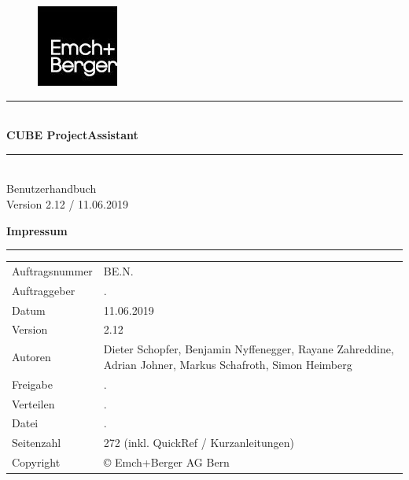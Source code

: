 \documentclass[12pt]{article} %
\newcommand{\HRule}{\rule{\linewidth}{0.5mm}} %
\begin{document}

\begin{titlepage}


\begin{figure}[t] %
\flushright  %
\includegraphics[width=0.2\linewidth]{0_EmBeLogo}
\end{figure}

\vspace*{6cm}

\center %

\HRule \\[0.4cm]
{ \huge \bfseries CUBE ProjectAssistant}\\[0.4cm] %
\HRule \\[1.5cm]

\textsf{\Large Benutzerhandbuch}\\[0.5cm] %
\textsf{\large Version 2.12 / 11.06.2019}\\[0.5cm] %

\pagebreak
\vspace*{15cm}

\flushleft\textbf{ Impressum}
\rule{\textwidth}{1pt}
\begin{flushright}	 
\begin{flushleft}

\end{flushleft}
\end{flushright}
\begin{tabular}{lp{12cm}}
Auftragsnummer & BE.N.\\
Auftraggeber & .\\
Datum & 11.06.2019\\
Version & 2.12\\
Autoren & Dieter Schopfer, Benjamin Nyffenegger, Rayane Zahreddine, Adrian Johner, Markus Schafroth, Simon Heimberg\\
Freigabe & .\\
Verteilen & .\\
Datei & .\\
Seitenzahl & 272 (inkl. QuickRef / Kurzanleitungen)\\
Copyright & \copyright{ Emch+Berger AG Bern}\\
\end{tabular}

\vfill %

\end{titlepage}
\end{document}
